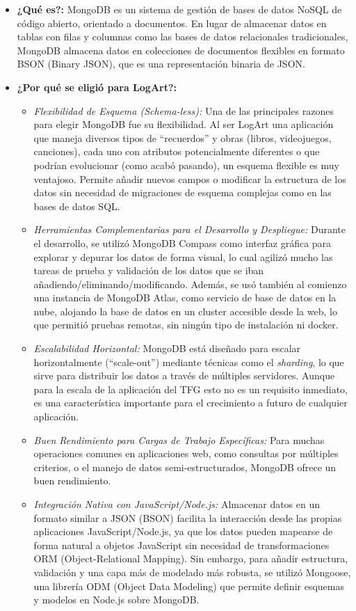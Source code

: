 \begin{itemize}
    \item \textbf{¿Qué es?:} MongoDB es un sistema de gestión de bases de datos NoSQL de código abierto, orientado a documentos. En lugar de almacenar datos en tablas con filas y columnas como las bases de datos relacionales tradicionales, MongoDB almacena datos en colecciones de documentos flexibles en formato BSON (Binary JSON), que es una representación binaria de JSON. \cite{aprenderbigdataMongoDB}
    \item \textbf{¿Por qué se eligió para LogArt?:}
        \begin{itemize}
            \item \textit{Flexibilidad de Esquema (Schema-less):} Una de las principales razones para elegir MongoDB fue su flexibilidad. Al ser LogArt una aplicación que maneja diversos tipos de ``recuerdos'' y obras (libros, videojuegos, canciones), cada uno con atributos potencialmente diferentes o que podrían evolucionar (como acabó pasando), un esquema flexible es muy ventajoso. Permite añadir nuevos campos o modificar la estructura de los datos sin necesidad de migraciones de esquema complejas como en las bases de datos SQL.
            \item \textit{Herramientas Complementarias para el Desarrollo y Despliegue:} Durante el desarrollo, se utilizó MongoDB Compass como interfaz gráfica para explorar y depurar los datos de forma visual, lo cual agilizó mucho las tareas de prueba y validación de los datos que se iban añadiendo/eliminando/modificando. Además, se usó también al comienzo una instancia de MongoDB Atlas, como servicio de base de datos en la nube, alojando la base de datos en un cluster accesible desde la web, lo que permitió pruebas remotas, sin ningún tipo de instalación ni docker.
            \item \textit{Escalabilidad Horizontal:} MongoDB está diseñado para escalar horizontalmente (``scale-out'') mediante técnicas como el \textit{sharding}, lo que sirve para distribuir los datos a través de múltiples servidores. Aunque para la escala de la aplicación del TFG esto no es un requisito inmediato, es una característica importante para el crecimiento a futuro de cualquier aplicación.
            \item \textit{Buen Rendimiento para Cargas de Trabajo Específicas:} Para muchas operaciones comunes en aplicaciones web, como consultas por múltiples criterios, o el manejo de datos semi-estructurados, MongoDB ofrece un buen rendimiento.
            \item \textit{Integración Nativa con JavaScript/Node.js:} Almacenar datos en un formato similar a JSON (BSON) facilita la interacción desde las propias aplicaciones JavaScript/Node.js, ya que los datos pueden mapearse de forma natural a objetos JavaScript sin necesidad de transformaciones ORM (Object-Relational Mapping). Sin embargo, para añadir estructura, validación y una capa más de modelado más robusta, se utilizó Mongoose, una librería ODM (Object Data Modeling) que permite definir esquemas y modelos en Node.js sobre MongoDB.

\end{itemize}
\end{itemize}
